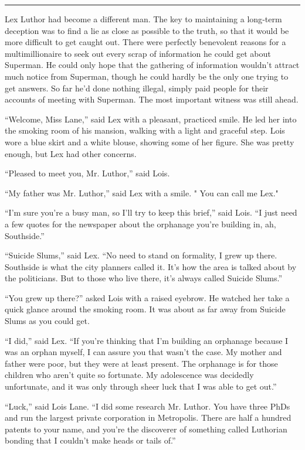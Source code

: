 \begin{center}\rule{0.5\linewidth}{\linethickness}\end{center}

Lex Luthor had become a different man. The key to maintaining a
long‐term deception was to find a lie as close as possible to the truth,
so that it would be more difficult to get caught out. There were
perfectly benevolent reasons for a multimillionaire to seek out every
scrap of information he could get about Superman. He could only hope
that the gathering of information wouldn't attract much notice from
Superman, though he could hardly be the only one trying to get answers.
So far he'd done nothing illegal, simply paid people for their accounts
of meeting with Superman. The most important witness was still ahead.

``Welcome, Miss Lane,'' said Lex with a pleasant, practiced smile. He
led her into the smoking room of his mansion, walking with a light and
graceful step. Lois wore a blue skirt and a white blouse, showing some
of her figure. She was pretty enough, but Lex had other concerns.

``Pleased to meet you, Mr. Luthor,'' said Lois.

``My father was Mr. Luthor,'' said Lex with a smile. " You can call me
Lex."

``I'm sure you're a busy man, so I'll try to keep this brief,'' said
Lois. ``I just need a few quotes for the newspaper about the orphanage
you're building in, ah, Southside.''

``Suicide Slums,'' said Lex. ``No need to stand on formality, I grew up
there. Southside is what the city planners called it. It's how the area
is talked about by the politicians. But to those who live there, it's
always called Suicide Slums.''

``You grew up there?'' asked Lois with a raised eyebrow. He watched her
take a quick glance around the smoking room. It was about as far away
from Suicide Slums as you could get.

``I did,'' said Lex. ``If you're thinking that I'm building an orphanage
because I was an orphan myself, I can assure you that wasn't the case.
My mother and father were poor, but they were at least present. The
orphanage is for those children who aren't quite so fortunate. My
adolescence was decidedly unfortunate, and it was only through sheer
luck that I was able to get out.''

``Luck,'' said Lois Lane. ``I did some research Mr. Luthor. You have
three PhDs and run the largest private corporation in Metropolis. There
are half a hundred patents to your name, and you're the discoverer of
something called Luthorian bonding that I couldn't make heads or tails
of.''


